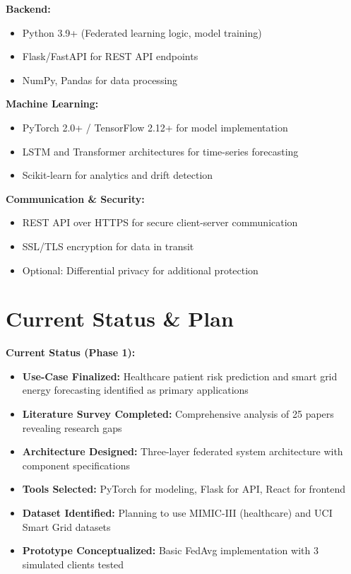 \documentclass[11pt, a4paper]{article}
\begin{document}
\textbf{Backend:}
\begin{itemize}[noitemsep, topsep=0pt]
    \item Python 3.9+ (Federated learning logic, model training)
    \item Flask/FastAPI for REST API endpoints
    \item NumPy, Pandas for data processing
\end{itemize}

\textbf{Machine Learning:}
\begin{itemize}[noitemsep, topsep=0pt]
    \item PyTorch 2.0+ / TensorFlow 2.12+ for model implementation
    \item LSTM and Transformer architectures for time-series forecasting
    \item Scikit-learn for analytics and drift detection
\end{itemize}

\textbf{Communication \& Security:}
\begin{itemize}[noitemsep, topsep=0pt]
    \item REST API over HTTPS for secure client-server communication
    \item SSL/TLS encryption for data in transit
    \item Optional: Differential privacy for additional protection
\end{itemize}

\section{Current Status \& Plan}

\textbf{Current Status (Phase 1):}
\begin{itemize}[noitemsep, topsep=0pt]
    \item \textbf{Use-Case Finalized:} Healthcare patient risk prediction and smart grid energy forecasting identified as primary applications
    \item \textbf{Literature Survey Completed:} Comprehensive analysis of 25 papers revealing research gaps
    \item \textbf{Architecture Designed:} Three-layer federated system architecture with component specifications
    \item \textbf{Tools Selected:} PyTorch for modeling, Flask for API, React for frontend
    \item \textbf{Dataset Identified:} Planning to use MIMIC-III (healthcare) and UCI Smart Grid datasets
    \item \textbf{Prototype Conceptualized:} Basic FedAvg implementation with 3 simulated clients tested
\end{itemize}
\end{document}
